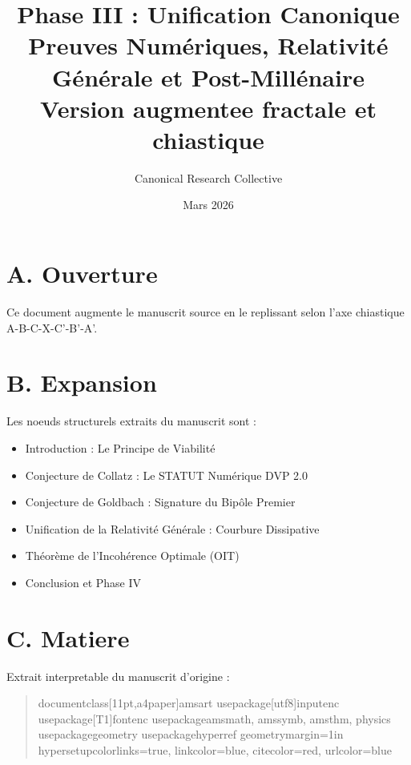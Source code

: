 \documentclass[11pt,a4paper]{article}
\title{Phase III : Unification Canonique \\ Preuves Numériques, Relativité Générale et Post-Millénaire \\ \large Version augmentee fractale et chiastique}
\author{Canonical Research Collective}
\date{Mars 2026}
\begin{document}
\maketitle

\section*{A. Ouverture}
Ce document augmente le manuscrit source en le replissant selon l'axe chiastique A-B-C-X-C'-B'-A'.

\section*{B. Expansion}
Les noeuds structurels extraits du manuscrit sont :
\begin{itemize}[leftmargin=1.2cm]
\item Introduction : Le Principe de Viabilité
\item Conjecture de Collatz : Le STATUT Numérique DVP 2.0
\item Conjecture de Goldbach : Signature du Bipôle Premier
\item Unification de la Relativité Générale : Courbure Dissipative
\item Théorème de l'Incohérence Optimale (OIT)
\item Conclusion et Phase IV
\end{itemize}

\section*{C. Matiere}
Extrait interpretable du manuscrit d'origine :
\begin{quote}
documentclass[11pt,a4paper]{amsart} usepackage[utf8]{inputenc} usepackage[T1]{fontenc} usepackage{amsmath, amssymb, amsthm, physics} usepackage{geometry} usepackage{hyperref} geometry{margin=1in} hypersetup{colorlinks=true, linkcolor=blue, citecolor=red, urlcolor=blue} %
\end{quote}
\end{document}
